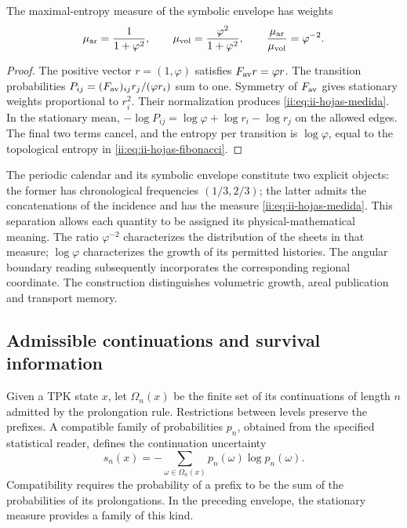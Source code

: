 \begin{proposition}
The maximal-entropy measure of the symbolic envelope has weights
\begin{equation}
 \mu_{\rm ar}=\frac{1}{1+\varphi^2},\qquad
 \mu_{\rm vol}=\frac{\varphi^2}{1+\varphi^2},\qquad
 \frac{\mu_{\rm ar}}{\mu_{\rm vol}}=\varphi^{-2}.
 \label{ii:eq:ii-hojas-medida}
\end{equation}
\end{proposition}
\begin{proof}
The positive vector \(r=(1,\varphi)\) satisfies
\(F_{\rm av}r=\varphi r\). The transition probabilities
\(P_{ij}=(F_{\rm av})_{ij}r_j/(\varphi r_i)\) sum to one.
Symmetry of \(F_{\rm av}\) gives stationary weights proportional
to \(r_i^2\). Their normalization produces
\eqref{ii:eq:ii-hojas-medida}. In the stationary mean,
\(-\log P_{ij}=\log\varphi+\log r_i-\log r_j\) on the
allowed edges. The final two terms cancel, and the
entropy per transition is \(\log\varphi\), equal to the topological
entropy in \eqref{ii:eq:ii-hojas-fibonacci}.
\end{proof}

The periodic calendar and its symbolic envelope constitute two
explicit objects: the former has chronological frequencies
\((1/3,2/3)\); the latter admits the concatenations of the incidence
and has the measure \eqref{ii:eq:ii-hojas-medida}. This separation allows
each quantity to be assigned its physical-mathematical meaning. The ratio
\(\varphi^{-2}\) characterizes the distribution of the sheets in that
measure; \(\log\varphi\) characterizes the growth of its permitted
histories. The angular boundary reading subsequently incorporates the
corresponding regional coordinate. The construction distinguishes
volumetric growth, areal publication and transport memory.

\subsection{Admissible continuations and survival information}
\label{ii:sec:ii-informacion-supervivencia}

Given a TPK state \(x\), let \(\Omega_n(x)\) be the finite set
of its continuations of length \(n\) admitted by the
prolongation rule. Restrictions between levels preserve the prefixes.
A compatible family of probabilities \(p_n\), obtained from
the specified statistical reader, defines the continuation
uncertainty
\begin{equation}
 s_n(x)=-\sum_{\omega\in\Omega_n(x)}
                 p_n(\omega)\log p_n(\omega).
 \label{ii:eq:ii-entropia-continuaciones}
\end{equation}
Compatibility requires the probability of a prefix to be the sum
of the probabilities of its prolongations. In the preceding envelope,
the stationary measure provides a family of this kind.

